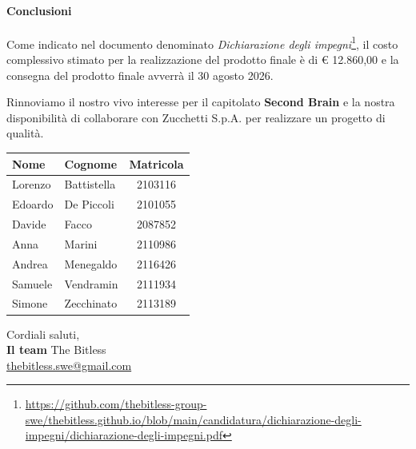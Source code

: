 \documentclass[a4paper, 10pt, colorlinks=true, linkcolor=black, urlcolor=blue, citecolor=blue, hidelinks]{article}
\begin{document}
\paragraph{Conclusioni}
Come indicato nel documento denominato \textit{Dichiarazione degli impegni}\footnote{\url{https://github.com/thebitless-group-swe/thebitless.github.io/blob/main/candidatura/dichiarazione-degli-impegni/dichiarazione-degli-impegni.pdf}}, il costo complessivo stimato per la realizzazione del prodotto finale è di € 12.860,00 e la consegna del prodotto finale avverrà il 30 agosto 2026.

\noindent Rinnoviamo il nostro vivo interesse per il capitolato \textbf{Second Brain} e la nostra disponibilità di collaborare con Zucchetti S.p.A. per realizzare un progetto di qualità. \\

\begin{center}
    \begin{tabular}{|l|l|c|}
        \hline
        \textbf{Nome} & \textbf{Cognome} & \textbf{Matricola} \\
        \hline
        Lorenzo & Battistella & 2103116 \\
        Edoardo & De Piccoli &  2101055 \\
        Davide & Facco &        2087852 \\
        Anna & Marini &         2110986\\
        Andrea & Menegaldo &    2116426 \\
        Samuele & Vendramin &   2111934 \\
        Simone & Zecchinato &   2113189 \\
        \hline
    \end{tabular}
\end{center}

\vspace{1cm}

\hfill
\begin{minipage}{0.4\textwidth}
    \centering
    Cordiali saluti, \\
    \textbf{Il team} The Bitless\\
    \href{mailto:thebitless.swe@gmail.com}{thebitless.swe@gmail.com}
\end{minipage}
\end{document}
